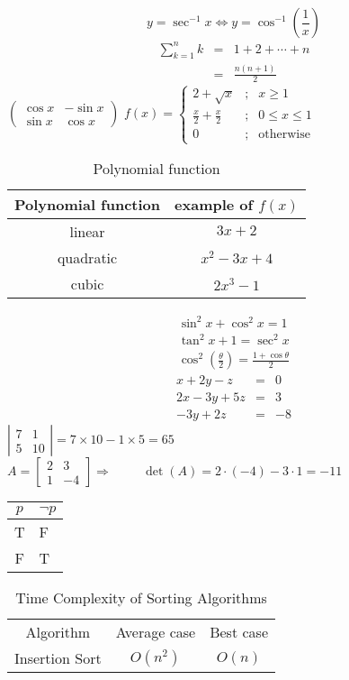 \documentclass{article}
\newcommand{\ds}{\displaystyle}
\begin{document}
\begin{equation}
\ds y=\sec^{-1}x \Leftrightarrow y=\cos^{-1}\left(\frac{1}{x}\right)
\end{equation}
\begin{eqnarray}
\ds\sum_{k=1}^{n}k&=&1+2+\cdots+n\nonumber\\
&=&\frac{n(n+1)}{2}
\end{eqnarray}
$
\left(
\begin{array}{rr}
\cos x&-\sin x\\
\sin x&\cos x
\end{array}
\right)
$
$
f(x)=
\left\{
\begin{array}{lcl}
2+\sqrt{x}&;&x\ge1\\
\ds\frac{x}{2}+\frac{x}{2}&;&0\le x\le 1\\
0&;&\text{otherwise}
\end{array}
\right.
$
\begin{table}[h]
\centering
\begin{tabular}{c|c}
Polynomial function&example of $f(x)$\\
\hline
linear&$3x+2$\\
quadratic&$x^2-3x+4$\\
cubic&$2x^3-1$
\end{tabular}
\caption{\scriptsize{Polynomial function}}
\end{table}
\begin{eqnarray*}
\sin^2 x+\cos^2 x=1\\
\tan^2 x+1=\sec^2x\\
\ds\cos^2\left(\frac{\theta}{2}\right)=\frac{1+\cos\theta}{2}
\end{eqnarray*}
\begin{eqnarray*}
x+2y-z&=&0\\
2x-3y+5z&=&3\\
-3y+2z&=&-8
\end{eqnarray*}
$\left|
\begin{array}{cc}
7&1\\
5&10
\end{array}
\right|=
7\times10-1\times5=65
$
\\
$
A=
\left[
\begin{array}{rr}
2&3\\
1&-4
\end{array}
\right]
\Rightarrow\hspace{1cm}
\det(A)=2\cdot(-4)-3\cdot1=-11
$

\begin{tabular}{c|l}
$p$&$\neg p$\\
\hline
T&F\\
F&T
\end{tabular}
\begin{table}[h]
\centering
\begin{tabular}{|c|cc|}
\hline
Algorithm&Average case &Best case\\
Insertion Sort&$O(n^2)$&$O(n)$\\
\hline
\end{tabular}
\caption{Time Complexity of Sorting Algorithms}
\end{table}
\end{document}
